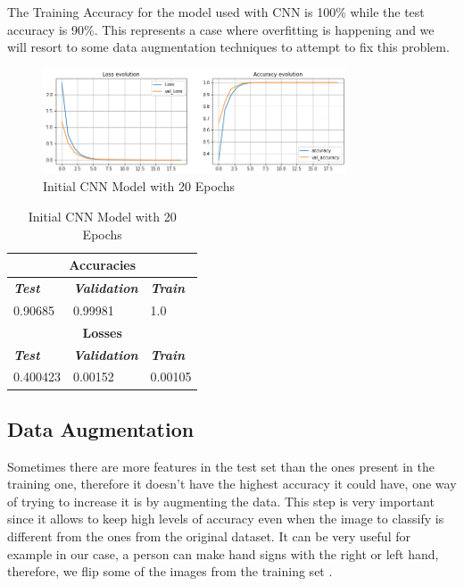 \documentclass[conference]{IEEEtran}
\begin{document}
The Training Accuracy for the model used with CNN is 100\% while the test accuracy is 90\%. This represents a case where overfitting is happening and we will resort to some data augmentation techniques to attempt to fix this problem.

\begin{figure}[htbp]
    \centerline{\includegraphics[width=9cm]{img/initial_model_noDataAug_20ep.png}}
    \caption{Initial CNN Model with 20 Epochs}
    \label{fig:hist_train_classes}
\end{figure}

\begin{table}[htbp]
\caption{Initial CNN Model with 20 Epochs}
\begin{center}
\begin{tabular}{|p{2cm}|p{2cm}|p{2cm}|}
\hline
\multicolumn{3}{|c|}{\textbf{Accuracies}} \\
\hline
\textbf{\textit{Test}}& \textbf{\textit{Validation}}& \textbf{\textit{Train}} \\
\hline
0.90685 & 0.99981 & 1.0 \\
\hline
\multicolumn{3}{|c|}{\textbf{Losses}} \\
\hline
\textbf{\textit{Test}}& \textbf{\textit{Validation}}& \textbf{\textit{Train}} \\
\hline
0.400423 & 0.00152 & 0.00105 \\
\hline
\end{tabular}
\end{center}
\end{table}

\subsection{Data Augmentation}

Sometimes there are more features in the test set than the ones present in the training one, therefore it doesn't have the highest accuracy it could have, one way of trying to increase it is by augmenting the data. This step is very important since it allows to keep high levels of accuracy even when the image to classify is different from the ones from the original dataset. It can be very useful for example in our case, a person can make hand signs with the right or left hand, therefore, we flip some of the images from the training set \cite{towardsdatascience_jachak}.
\end{document}
